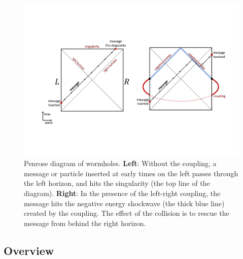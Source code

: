 \documentclass[aps,pra,reprint,floatfix,superscriptaddress, nofootinbib,longbibliography,onecolumn,notitlepage,12pt, tightenlines]{revtex4-1}
\begin{document}
\begin{figure}
\includegraphics[width=\textwidth]{042.pdf}
\caption{Penrose diagram of wormholes.
\textbf{Left}: Without the coupling, a message or particle inserted at early times on the left passes through the left horizon, and hits the singularity (the top line of the diagram).
\textbf{Right}: In the presence of the left-right coupling, the message hits the negative energy shockwave (the thick blue line) created by the coupling. The effect of the collision is to rescue the message from behind the right horizon.}
\label{fig:Penrose_Diagram}
\end{figure}

\subsection{Overview}
\end{document}
